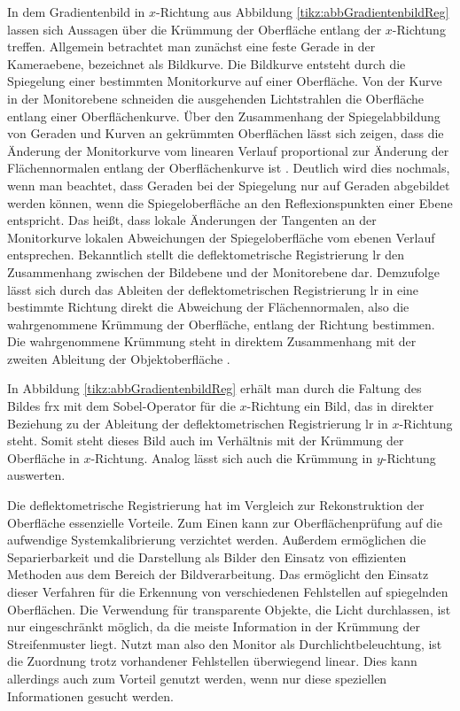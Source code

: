 \p
In dem Gradientenbild in $x$-Richtung aus Abbildung \ref{tikz:abbGradientenbildReg} lassen sich Aussagen über die Krümmung der Oberfläche entlang der $x$-Richtung treffen.
Allgemein betrachtet man zu\-nächst eine feste Gerade in der Kameraebene, bezeichnet als Bildkurve.
Die Bildkurve entsteht durch die Spiegelung einer bestimmten Monitorkurve auf einer Oberfläche.
Von der Kurve in der Monitorebene schneiden die ausgehenden Lichtstrahlen die Oberfläche entlang einer Oberflächenkurve.
Über den Zusammenhang der Spiegelabbildung von Geraden und Kurven an gekrümmten Oberflächen lässt sich zeigen, dass die Änderung der Monitorkurve vom linearen Verlauf proportional zur Änderung der Flächennormalen entlang der Oberflächenkurve ist \cite{kit_werling}.
Deutlich wird dies nochmals, wenn man beachtet, dass Geraden bei der Spiegelung nur auf Geraden abgebildet werden können, wenn die Spiegeloberfläche an den Reflexionspunkten einer Ebene entspricht.
Das heißt, dass lokale Änderungen der Tangenten an der Monitorkurve lokalen Abweichungen der Spiegeloberfläche vom ebenen Verlauf entsprechen.
Bekanntlich stellt die deflektometrische Registrierung \acrshort{lr} den Zusammenhang zwischen der Bildebene und der Monitorebene dar.
Demzufolge lässt sich durch das Ableiten der deflektometrischen Registrierung \acrshort{lr} in eine bestimmte Richtung direkt die Abweichung der Flächennormalen, also die wahrgenommene Krümmung der Oberfläche, entlang der Richtung bestimmen.
Die wahrgenommene Krümmung steht in direktem Zusammenhang mit der zweiten Ableitung der Objektoberfläche \cite{kit_werling}.

\p
In Abbildung \ref{tikz:abbGradientenbildReg} erhält man durch die Faltung des Bildes \acrshort{frx} mit dem Sobel-Operator für die $x$-Richtung ein Bild, das in direkter Beziehung zu der Ableitung der deflektometrischen Registrierung \acrshort{lr} in  $x$-Richtung steht.
Somit steht dieses Bild auch im Verhältnis mit der Krümmung der Oberfläche in $x$-Richtung.
Analog lässt sich auch die Krümmung in $y$-Richtung auswerten.

\p
Die deflektometrische Registrierung hat im Vergleich zur Rekonstruktion der Oberfläche essenzielle Vorteile.
Zum Einen kann zur Oberflächenprüfung auf die aufwendige Systemkalibrierung verzichtet werden.
Außerdem ermöglichen die Separierbarkeit und die Darstellung als Bilder den Einsatz von effizienten Methoden aus dem Bereich der Bildverarbeitung.
Das ermöglicht den Einsatz dieser Verfahren für die Erkennung von verschiedenen Fehlstellen auf spiegelnden Oberflächen.
Die Verwendung für transparente Objekte, die Licht durchlassen, ist nur eingeschränkt möglich, da die meiste Information in der Krümmung der Streifenmuster liegt.
Nutzt man also den Monitor als Durchlichtbeleuchtung, ist die Zuordnung trotz vorhandener Fehlstellen überwiegend linear.
Dies kann allerdings auch zum Vorteil genutzt werden, wenn nur diese speziellen Informationen gesucht werden.